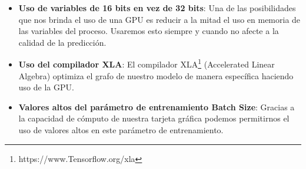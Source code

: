 \begin{itemize}
    \item \textbf{Uso de variables de 16 bits en vez de 32 bits}: Una de las posibilidades que nos brinda el uso de una GPU es reducir a la mitad el uso en memoria de las variables del proceso.
    Usaremos esto siempre y cuando no afecte a la calidad de la predicción.
    \item \textbf{Uso del compilador XLA}: El compilador XLA\footnote{https://www.Tensorflow.org/xla} (Accelerated Linear Algebra) optimiza el grafo de nuestro modelo de manera específica haciendo uso de la GPU.
    \item \textbf{Valores altos del parámetro de entrenamiento Batch Size}: Gracias a la capacidad de cómputo de nuestra tarjeta gráfica podemos permitirnos el uso de valores altos en este parámetro de entrenamiento.
\end{itemize}


